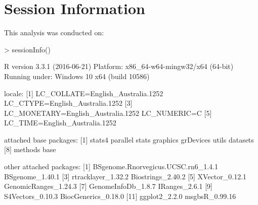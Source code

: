 \documentclass{article}
\begin{document}
\section{Session Information}
This analysis was conducted on:
\begin{Schunk}
\begin{Sinput}
> sessionInfo()
\end{Sinput}
\begin{Soutput}
R version 3.3.1 (2016-06-21)
Platform: x86_64-w64-mingw32/x64 (64-bit)
Running under: Windows 10 x64 (build 10586)

locale:
[1] LC_COLLATE=English_Australia.1252  LC_CTYPE=English_Australia.1252   
[3] LC_MONETARY=English_Australia.1252 LC_NUMERIC=C                      
[5] LC_TIME=English_Australia.1252    

attached base packages:
[1] stats4    parallel  stats     graphics  grDevices utils     datasets 
[8] methods   base     

other attached packages:
 [1] BSgenome.Rnorvegicus.UCSC.rn6_1.4.1 BSgenome_1.40.1                    
 [3] rtracklayer_1.32.2                  Biostrings_2.40.2                  
 [5] XVector_0.12.1                      GenomicRanges_1.24.3               
 [7] GenomeInfoDb_1.8.7                  IRanges_2.6.1                      
 [9] S4Vectors_0.10.3                    BiocGenerics_0.18.0                
[11] ggplot2_2.2.0                       msgbsR_0.99.16                     


\end{Soutput}
\end{Schunk}
\end{document}
